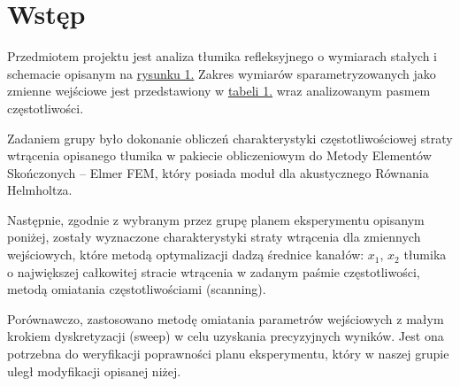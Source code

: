\documentclass{sprawozdanie-agh}
\begin{document}
\section{Wstęp}
\par Przedmiotem projektu jest analiza tłumika refleksyjnego o wymiarach stałych i schemacie opisanym na \hyperref[rysunek]{rysunku 1.} Zakres wymiarów sparametryzowanych jako zmienne wejściowe jest przedstawiony w \hyperref[tabela]{tabeli 1.} wraz analizowanym pasmem częstotliwości.
\par Zadaniem grupy było dokonanie obliczeń charakterystyki częstotliwościowej straty wtrącenia opisanego tłumika w pakiecie obliczeniowym do Metody Elementów Skończonych -- Elmer FEM, który posiada moduł dla akustycznego Równania Helmholtza.
\par Następnie, zgodnie z wybranym przez grupę planem eksperymentu opisanym poniżej, zostały wyznaczone charakterystyki straty wtrącenia dla zmiennych wejściowych, które metodą optymalizacji dadzą średnice kanałów: $x_1$, $x_2$ tłumika o największej całkowitej stracie wtrącenia w zadanym paśmie częstotliwości, metodą omiatania częstotliwościami (scanning).
\par Porównawczo, zastosowano metodę omiatania parametrów wejściowych z małym krokiem dyskretyzacji (sweep) w celu uzyskania precyzyjnych wyników. Jest ona potrzebna do weryfikacji poprawności planu eksperymentu, który w naszej grupie uległ modyfikacji opisanej niżej.
\end{document}
